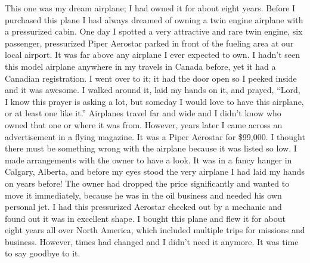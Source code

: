 \documentclass[oneside]{book}
\begin{document}
This one was my dream airplane; I had owned it for about eight years. Before I purchased this plane I had always dreamed of owning a twin engine airplane with a pressurized cabin. One day I spotted a very attractive and rare twin engine, six passenger, pressurized Piper Aerostar parked in front of the fueling area at our local airport. It was far above any airplane I ever expected to own. I hadn’t seen this model airplane anywhere in my travels in Canada before, yet it had a Canadian registration. I went over to it; it had the door open so I peeked inside and it was awesome. I walked around it, laid my hands on it, and prayed, “Lord, I know this prayer is asking a lot, but someday I would love to have this airplane, or at least one like it.” Airplanes travel far and wide and I didn’t know who owned that one or where it was from. However, years later I came across an advertisement in a flying magazine. It was a Piper Aerostar for \$99,000. I thought there must be something wrong with the airplane because it was listed so low. I made arrangements with the owner to have a look. It was in a fancy hanger in Calgary, Alberta, and before my eyes stood the very airplane I had laid my hands on years before! The owner had dropped the price significantly and wanted to move it immediately, because he was in the oil business and needed his own personal jet. I had this pressurized Aerostar checked out by a mechanic and found out it was in excellent shape. I bought this plane and flew it for about eight years all over North America, which included multiple trips for missions and business. However, times had changed and I didn’t need it anymore. It was time to say goodbye to it.
\end{document}
